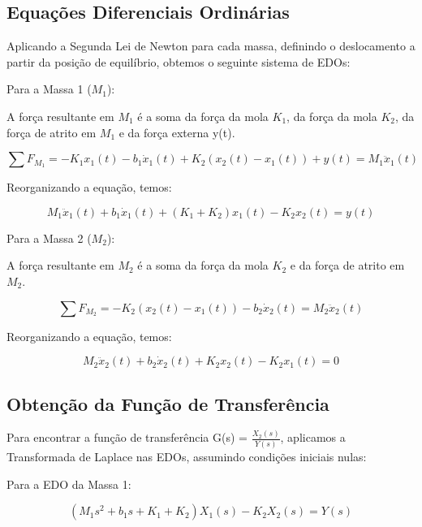 \documentclass[9pt,a4paper,twocolumn,twoside]{tau-class/tau}
\begin{document}
\subsection{Equações Diferenciais Ordinárias}

Aplicando a Segunda Lei de Newton para cada massa, definindo o deslocamento a partir da posição de equilíbrio, obtemos o seguinte sistema de EDOs:

Para a Massa 1 ($M_1$):

A força resultante em $M_1$ é a soma da força da mola $K_1$, da força da mola $K_2$, da força de atrito em $M_1$ e da força externa y(t).

\begin{equation}
    \sum F_{M_1} = -K_1 x_1(t) - b_1 \dot x_1(t) + K_2(x_2(t) - x_1(t)) + y(t) = M_1 \ddot{x}_1(t)
\label{eq:SomaM1}
\end{equation}

Reorganizando a equação, temos:

\begin{equation}
    M_1 \ddot{x}_1(t) + b_1 \dot x_1(t) + (K_1 + K_2) x_1(t) - K_2x_2(t) = y(t)
\label{eq:Reorg}
\end{equation}

Para a Massa 2 ($M_2$):

A força resultante em $M_2$ é a soma da força da mola $K_2$ e da força de atrito em $M_2$.

\begin{equation}
    \sum F_{M_2} = -K_2(x_2(t) - x_1(t)) - b_2\dot{x}_2(t) = M_2 \ddot{x}_2(t)
    \label{eq:M2}
\end{equation}

Reorganizando a equação, temos:

\begin{equation}
    M_2 \ddot{x}_2(t) + b_2\dot{x}_2(t) + K_2 x_2(t) - K_2 x_1(t) =  0
    \label{M2reorg}
\end{equation}

\subsection{Obtenção da Função de Transferência}

Para encontrar a função de transferência G(s) = $\frac{X_2(s)}{Y(s)}$, aplicamos a Transformada de Laplace nas EDOs, assumindo condições iniciais nulas:

Para a EDO da Massa 1:

\begin{equation}
    (M_1s^2 + b_1s + K_1 + K_2)X_1(s) - K_2X_2(s) = Y(s)
    \label{eq:EDOM1}
\end{equation}
\end{document}
